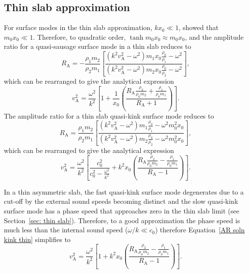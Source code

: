 \documentclass[12pt]{../style-files/ociamthesis}
\begin{document}
\subsection{Thin slab approximation} \label{sec: AR thin slab}
For surface modes in the thin slab approximation, $kx_0 \ll 1$, \cite{rob81b} showed that $m_0x_0 \ll 1$. Therefore, to quadratic order, $\tanh{m_0x_0} \approx m_0x_0$, and the amplitude ratio for a quasi-sausage surface mode in a thin slab reduces to
\begin{equation}
R_\textrm{A} = -\frac{\rho_1m_2}{\rho_2m_1}\left[\frac{(k^2v_\textrm{A}^2 - \omega^2)m_1x_0\frac{\rho_0}{\rho_1} - \omega^2}{(k^2v_\textrm{A}^2 - \omega^2)m_2x_0\frac{\rho_0}{\rho_2} - \omega^2}\right], 
\end{equation}
which can be rearranged to give the analytical expression
\begin{equation}
v_\textrm{A}^2 = \frac{\omega^2}{k^2} \left[1 + \frac{1}{x_0} \left(\frac{R_\textrm{A}\frac{\rho_2}{\rho_0m_2} + \frac{\rho_1}{\rho_0m_1}}{R_\textrm{A} + 1}\right)\right].
\end{equation}
The amplitude ratio for a thin slab quasi-kink surface mode reduces to
\begin{equation}
R_\textrm{A} = \frac{\rho_1m_2}{\rho_2m_1} \left[\frac{(k^2v_\textrm{A}^2 - \omega^2)m_1\frac{\rho_0}{\rho_1} - \omega^2m_0^2x_0}{(k^2v_\textrm{A}^2 - \omega^2)m_2\frac{\rho_0}{\rho_2} - \omega^2m_0^2x_0}\right], 
\end{equation}
which can be rearranged to give the analytical expression
\begin{equation}
v_\textrm{A}^2 = \frac{\omega^2}{k^2} \left[\frac{c_0^2}{c_0^2 - \frac{\omega^2}{k^2}} + k^2x_0\left(\frac{R_\textrm{A}\frac{\rho_2}{\rho_0m_2} - \frac{\rho_1}{\rho_0m_1}}{R_\textrm{A} - 1}\right)\right]. \label{AR soln kink thin}
\end{equation}

In a thin asymmetric slab, the fast quasi-kink surface mode degenerates due to a cut-off by the external sound speeds becoming distinct \citep{all_etal17} and the slow quasi-kink surface mode has a phase speed that approaches zero in the thin slab limit (see Section~\ref{sec: thin slab}). Therefore, to a good approximation the phase speed is much less than the internal sound speed ($\omega/k \ll c_0$) therefore Equation~\eqref{AR soln kink thin} simplifies to
\begin{equation}
v_\textrm{A}^2 = \frac{\omega^2}{k^2} \left[1 + k^2x_0\left(\frac{R_\textrm{A}\frac{\rho_2}{\rho_0m_2} - \frac{\rho_1}{\rho_0m_1}}{R_\textrm{A} - 1}\right)\right]. \label{AR soln kink thin simplified}
\end{equation}
\end{document}
